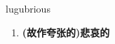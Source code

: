 
\begin{frame}
{\huge lugubrious}
\begin{center}
\begin{enumerate}\Large
  \item \textbf{(故作夸张的)悲哀的}
\end{enumerate}
\end{center}
\end{frame}

